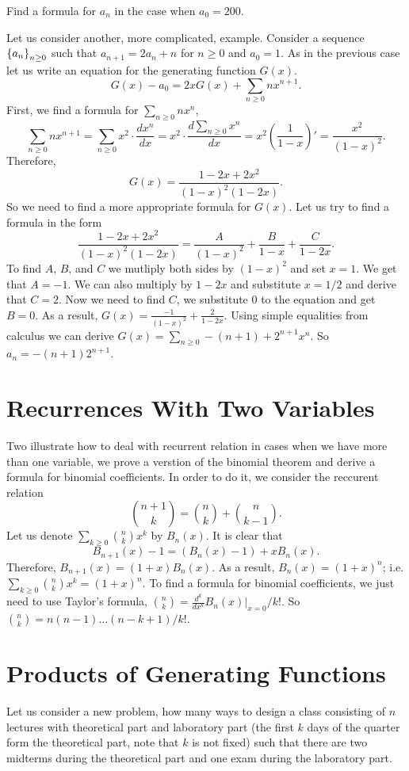 \begin{exercise}
  Find a formula for $a_n$ in the case when $a_0 = 200$.
\end{exercise}

Let us consider another, more complicated, example. Consider a sequence
$\set{a_n}_{n \ge 0}$ such that $a_{n + 1} = 2a_n + n$ for $n \ge 0$ and
$a_0 = 1$. As in the previous case let us write an equation for the
generating function $G(x)$.
\[
  G(x) - a_0 = 2xG(x) + \sum_{n \ge 0} n x^{n + 1}.
\]
First, we find a formula for $\sum_{n \ge 0} n x^n$,
\[
  \sum_{n \ge 0} n x^{n + 1} = \sum_{n \ge 0} x^2 \cdot \frac{d x^n}{dx} =
  x^2 \cdot \frac{d \sum_{n \ge 0} x^n}{dx} = x^2 \left(\frac{1}{1 - x}\right)'
  = \frac{x^2}{(1 - x)^2}.
\]
Therefore,
\[
  G(x) = \frac{1 - 2x + 2x^2}{(1 - x)^2 (1 - 2x)}.
\]
So we need to find a more appropriate formula for $G(x)$.
Let us try to find a formula in the form
\[
  \frac{1 - 2x + 2x^2}{(1 - x)^2 (1 - 2x)} =
    \frac{A}{(1 - x)^2} + \frac{B}{1 - x} + \frac{C}{1 - 2x}.
\]
To find $A$, $B$, and $C$ we mutliply both sides by $(1 - x)^2$ and set $x = 1$.
We get that $A = -1$. We can also multiply by $1 - 2x$ and substitute
$x = 1 / 2$ and derive that $C = 2$. Now we need to find $C$, we substitute $0$
to the equation and get $B = 0$. As a result,
$G(x) = \frac{-1}{(1 - x)^2} + \frac{2}{1 - 2x}$. Using simple equalities from
calculus we can derive $G(x) = \sum_{n \ge 0} -(n + 1) + 2^{n + 1} x^n$.
So $a_n = -(n + 1) 2^{n + 1}$.

\section{Recurrences With Two Variables}
Two illustrate how to deal with recurrent relation in cases when we have
more than one variable, we prove a verstion of the binomial theorem and
derive a formula for binomial coefficients. In order to do it,
we consider the reccurent relation
\[
  \binom{n + 1}{k} = \binom{n}{k} + \binom{n}{k - 1}.
\]
Let us denote $\sum_{k \ge 0} \binom{n}{k} x^k$ by $B_n(x)$.
It is clear that
\[
  B_{n + 1}(x) - 1 = (B_n(x) - 1) + x B_n(x).
\]
Therefore, $B_{n + 1}(x) = (1 + x) B_n(x)$. As a result, $B_n(x) = (1 + x)^n$;
i.e. $\sum_{k \ge 0} \binom{n}{k} x^k = (1 + x)^n$. To find a
formula for binomial coefficients, we just need to use Taylor's formula,
$\binom{n}{k} = \frac{d^k}{dx^k} B_n(x)\big\rvert_{x = 0}  / k!$. So
$\binom{n}{k} = n (n - 1) \dots (n - k + 1) / k!$.

\section{Products of Generating Functions}
Let us consider a new problem, how many ways to design a class consisting of
$n$ lectures with theoretical part and laboratory part (the first $k$ days of
the quarter form the theoretical part, note that $k$ is not fixed) such that
there are two midterms during the theoretical part and one exam during the
laboratory part.

